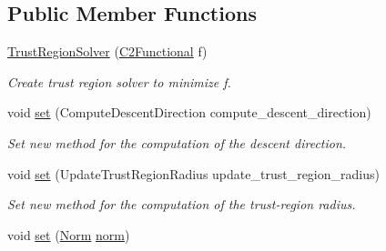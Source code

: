 \subsection*{Public Member Functions}
\begin{DoxyCompactItemize}
\item 
\hyperlink{classSpacy_1_1Algorithm_1_1TrustRegionSolver_a0e43b97119b6dc0a25fc9f242b084d16}{Trust\-Region\-Solver} (\hyperlink{classSpacy_1_1C2Functional}{C2\-Functional} f)
\begin{DoxyCompactList}\small\item\em Create trust region solver to minimize f. \end{DoxyCompactList}\item 
\hypertarget{classSpacy_1_1Algorithm_1_1TrustRegionSolver_aa36019ca1c80a230a1c45022d3cdfd9f}{void \hyperlink{classSpacy_1_1Algorithm_1_1TrustRegionSolver_aa36019ca1c80a230a1c45022d3cdfd9f}{set} (Compute\-Descent\-Direction compute\-\_\-descent\-\_\-direction)}\label{classSpacy_1_1Algorithm_1_1TrustRegionSolver_aa36019ca1c80a230a1c45022d3cdfd9f}

\begin{DoxyCompactList}\small\item\em Set new method for the computation of the descent direction. \end{DoxyCompactList}\item 
\hypertarget{classSpacy_1_1Algorithm_1_1TrustRegionSolver_a9f276e949d1dbfc6f40574be638e1fff}{void \hyperlink{classSpacy_1_1Algorithm_1_1TrustRegionSolver_a9f276e949d1dbfc6f40574be638e1fff}{set} (Update\-Trust\-Region\-Radius update\-\_\-trust\-\_\-region\-\_\-radius)}\label{classSpacy_1_1Algorithm_1_1TrustRegionSolver_a9f276e949d1dbfc6f40574be638e1fff}

\begin{DoxyCompactList}\small\item\em Set new method for the computation of the trust-\/region radius. \end{DoxyCompactList}\item 
\hypertarget{classSpacy_1_1Algorithm_1_1TrustRegionSolver_a680c40b650a60c9e9935e0c6b0e65888}{void \hyperlink{classSpacy_1_1Algorithm_1_1TrustRegionSolver_a680c40b650a60c9e9935e0c6b0e65888}{set} (\hyperlink{namespaceSpacy_a0dbe77a4e1282ef88017e94d50d17791}{Norm} \hyperlink{namespaceSpacy_a86a4fc266aa19a07b0af16388907354b}{norm})}\label{classSpacy_1_1Algorithm_1_1TrustRegionSolver_a680c40b650a60c9e9935e0c6b0e65888}


\end{DoxyCompactItemize}
